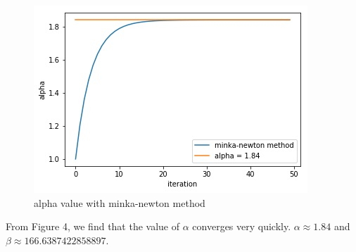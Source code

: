 \documentclass{article}
\begin{document}
\begin{figure}[ht]
\centering
\includegraphics[scale=0.5]{alpha.jpg}
\caption{ alpha value with minka-newton method}
\end{figure}
From Figure 4, we find that the value of $\alpha$ converges very quickly. $\alpha \approx 1.84$ and $\beta \approx 166.6387422858897$.
\end{document}
